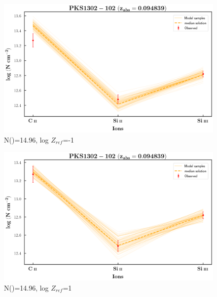 \documentclass[12pt]{report}
\newcommand\ion[2]{\text{#1\,\textsc{\lowercase{#2}}}}
\begin{document}
\begin{figure}[!t]
    \centering
    \includegraphics[width=0.9\linewidth]{Ionisation-Modelling-Plots/pks1302-z=0.094839-compII_logZ=-1.png}
    \caption{N(\ion{H}{i})=14.96, log $Z_{ref}$=-1}
\end{figure}

\begin{figure}[!b]
    \centering
    \includegraphics[width=0.9\linewidth]{Ionisation-Modelling-Plots/pks1302-z=0.094839-compII_logZ=1.png}
    \caption{N(\ion{H}{i})=14.96, log $Z_{ref}$=1}
\end{figure}



\newpage
\end{document}
